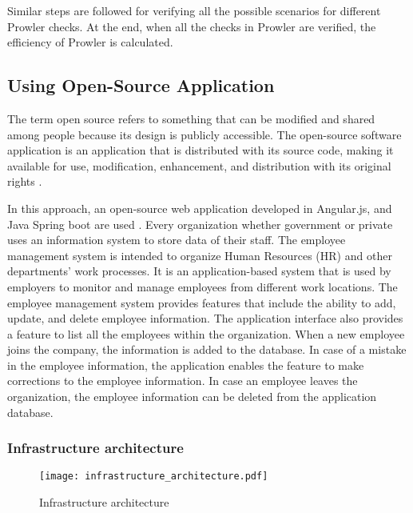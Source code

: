 \par Similar steps are followed for verifying all the possible scenarios for different Prowler checks. At the end, when all the checks in Prowler are verified, the efficiency of Prowler is calculated.

\subsection{Using Open-Source Application}

\par The term open source refers to something that can be modified and shared among people because its design is publicly accessible.
The open-source software application is an application that is distributed with its source code, making it available
for use, modification, enhancement, and distribution with its original rights \cite{68}.

\par \par In this approach, an open-source web application developed in Angular.js, and Java Spring boot are used \cite{69}.
Every organization whether government or private uses an information system to store data of their staff.
The employee management system is intended to organize Human Resources (HR) and other departments' work processes.
It is an application-based system that is used by employers to monitor and manage employees from different work locations.
The employee management system provides features that include the ability to add, update, and delete employee information.
The application interface also provides a feature to list all the employees within the organization.
When a new employee joins the company, the information is added to the database.
In case of a mistake in the employee information, the application enables the feature to make corrections to the employee information.
In case an employee leaves the organization, the employee information can be deleted from the application database.

\subsubsection{Infrastructure architecture}

\begin{figure}
    \centering
    \texttt{[image: infrastructure\_architecture.pdf]}
    \caption{Infrastructure architecture}
    \label{fig:infrastructure_architecture}
\end{figure}

